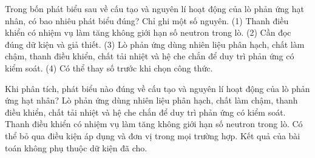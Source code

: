 \begin{ex}
Trong bốn phát biểu sau về cấu tạo và nguyên lí hoạt động của lò phản ứng hạt nhân, có bao nhiêu phát biểu đúng? Chỉ ghi một số nguyên. (1) Thanh điều khiển có nhiệm vụ làm tăng không giới hạn số neutron trong lò. (2) Cần đọc đúng dữ kiện và giả thiết. (3) Lò phản ứng dùng nhiên liệu phân hạch, chất làm chậm, thanh điều khiển, chất tải nhiệt và hệ che chắn để duy trì phản ứng có kiểm soát. (4) Có thể thay số trước khi chọn công thức.
\end{ex}

\begin{ex}
Khi phân tích, phát biểu nào đúng về cấu tạo và nguyên lí hoạt động của lò phản ứng hạt nhân?
\choice
{\True Lò phản ứng dùng nhiên liệu phân hạch, chất làm chậm, thanh điều khiển, chất tải nhiệt và hệ che chắn để duy trì phản ứng có kiểm soát.}
{Thanh điều khiển có nhiệm vụ làm tăng không giới hạn số neutron trong lò.}
{Có thể bỏ qua điều kiện áp dụng và đơn vị trong mọi trường hợp.}
{Kết quả của bài toán không phụ thuộc dữ kiện đã cho.}
\end{ex}


